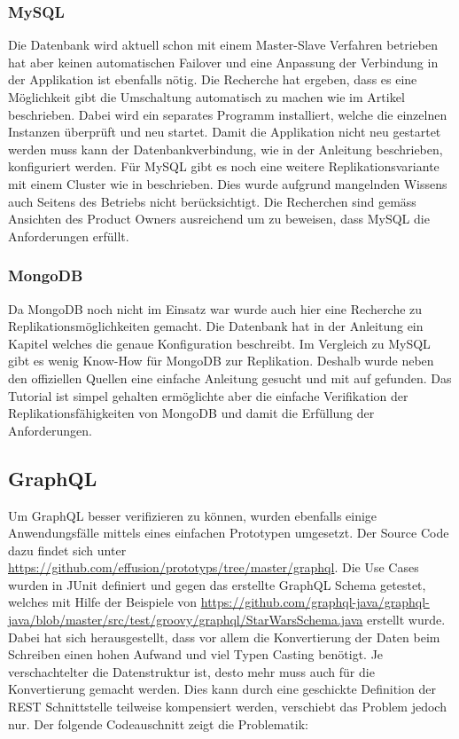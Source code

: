 \subsubsection{MySQL}

Die Datenbank wird aktuell schon mit einem Master-Slave Verfahren betrieben hat aber keinen automatischen Failover und eine Anpassung der Verbindung in der Applikation ist ebenfalls nötig. Die Recherche hat ergeben, dass es eine Möglichkeit gibt die Umschaltung automatisch zu machen wie im Artikel \cite{mysqlrep} beschrieben. Dabei wird ein separates Programm installiert, welche die einzelnen Instanzen überprüft und neu startet. Damit die Applikation nicht neu gestartet werden muss kann der Datenbankverbindung, wie in der Anleitung \cite{mysqljdbc} beschrieben, konfiguriert werden. Für MySQL gibt es noch eine weitere Replikationsvariante mit einem Cluster wie in \cite{mysqlcluster} beschrieben. Dies wurde aufgrund mangelnden Wissens auch Seitens des Betriebs nicht berücksichtigt. Die Recherchen sind gemäss Ansichten des Product Owners ausreichend um zu beweisen, dass MySQL die Anforderungen erfüllt.

\subsubsection{MongoDB}

Da MongoDB noch nicht im Einsatz war wurde auch hier eine Recherche zu Replikationsmöglichkeiten gemacht. Die Datenbank hat in der Anleitung ein Kapitel \cite{mongorep} welches die genaue Konfiguration beschreibt. Im Vergleich zu MySQL gibt es wenig Know-How für MongoDB zur Replikation. Deshalb wurde neben den offiziellen Quellen eine einfache Anleitung gesucht und mit \cite{mongorep2} auf gefunden. Das Tutorial ist simpel gehalten ermöglichte aber die einfache Verifikation der Replikationsfähigkeiten von MongoDB und damit die Erfüllung der Anforderungen.
\newpage

\subsection{GraphQL}

Um GraphQL besser verifizieren zu können, wurden ebenfalls einige Anwendungsfälle mittels eines einfachen Prototypen umgesetzt. Der Source Code dazu findet sich unter \url{https://github.com/effusion/prototyps/tree/master/graphql}. Die Use Cases wurden in JUnit definiert und gegen das erstellte GraphQL Schema getestet, welches mit Hilfe der Beispiele von \url{https://github.com/graphql-java/graphql-java/blob/master/src/test/groovy/graphql/StarWarsSchema.java} erstellt wurde. Dabei hat sich herausgestellt, dass vor allem die Konvertierung der Daten beim Schreiben einen hohen Aufwand und viel Typen Casting benötigt. Je verschachtelter die Datenstruktur ist, desto mehr muss auch für die Konvertierung gemacht werden. Dies kann durch eine geschickte Definition der REST Schnittstelle teilweise kompensiert werden, verschiebt das Problem jedoch nur. Der folgende Codeauschnitt zeigt die Problematik:

